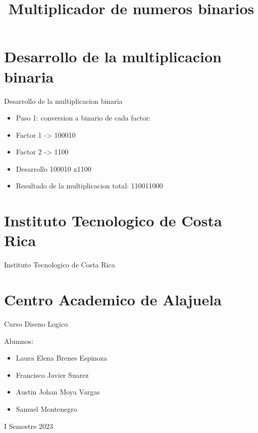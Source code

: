 \documentclass[11pt]{beamer}
\title{Multiplicador de numeros binarios}
\begin{document}
    \begin{frame}
        \maketitle
    \end{frame}
    \section{Desarrollo de la multiplicacion binaria}
    \begin{frame}{Desarrollo de la multiplicacion binaria}
        \begin{itemize}
        \item Paso 1: conversion a binario de cada factor:
        \item    Factor 1 -> 100010
        \item    Factor 2 -> 1100
        \item Desarrollo 
        \newline
      \hphantom{123456789101112}100010
        \newline      \hphantom{12345678910111}x1100
        \item Resultado de la multiplicacion total: 110011000
        \end{itemize}
    \end{frame}
    \section{Instituto Tecnologico de Costa Rica}
    \begin{frame}{Instituto Tecnologico de Costa Rica}    \section{Centro Academico de Alajuela}        Curso Diseno Logico 
        \newline

        Alumnos:
        \begin{itemize}
        \item Laura Elena Brenes Espinoza
        \item Francisco Javier Suarez 
        \item Austin Johan Moya Vargas
        \item Samuel Montenegro
        \end{itemize}

        I Semestre 2023
    \end{frame}
    
\end{document}
